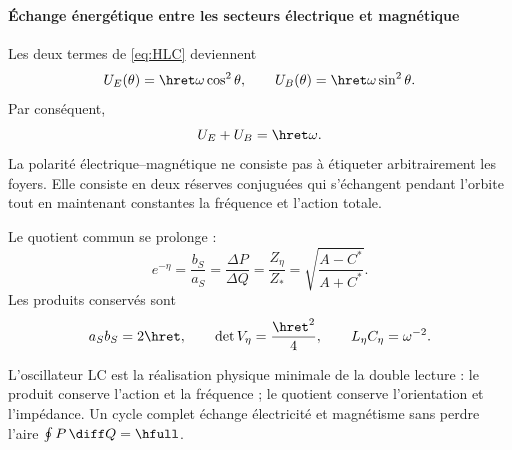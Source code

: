 \paragraph{Échange énergétique entre les secteurs électrique et magnétique}

Les deux termes de \eqref{eq:HLC} deviennent
\begin{equation}
U_E(\theta)=\hret\omega\cos^2\theta,
\qquad
U_B(\theta)=\hret\omega\sin^2\theta.
\label{eq:energy-exchange}
\end{equation}
Par conséquent,
\[
U_E+U_B=\hret\omega.
\]
La polarité électrique--magnétique ne consiste pas à étiqueter arbitrairement
les foyers. Elle consiste en deux réserves conjuguées qui s'échangent pendant
l'orbite tout en maintenant constantes la fréquence et l'action totale.

Le quotient commun se prolonge :
\begin{equation}
\boxed{
e^{-\eta}
=\frac{b_S}{a_S}
=\frac{\Delta P}{\Delta Q}
=\frac{Z_\eta}{Z_*}
=\sqrt{\frac{A-C^*}{A+C^*}}.}
\label{eq:shape-chain-LC}
\end{equation}
Les produits conservés sont
\[
a_Sb_S=2\hret,\qquad
\det V_\eta=\frac{\hret^2}{4},
\qquad
L_\eta C_\eta=\omega^{-2}.
\]

\begin{exactbox}
L'oscillateur LC est la réalisation physique minimale de la double lecture : le
produit conserve l'action et la fréquence ; le quotient conserve l'orientation et
l'impédance. Un cycle complet échange électricité et magnétisme sans
perdre l'aire \(\oint P\,\diff Q=\hfull\).
\end{exactbox}

